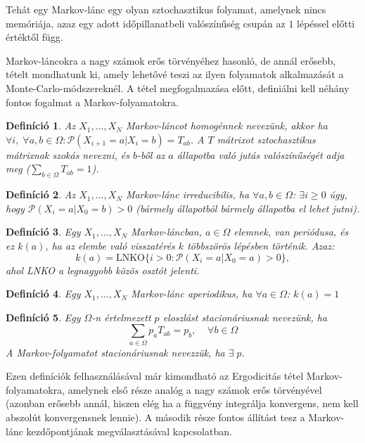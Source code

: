 \documentclass[11pt,a4paper]{article}
\numberwithin{equation}{subsection}
\numberwithin{figure}{section}
\newtheorem{definition}{Definíció}[section]
\begin{document}
Tehát egy Markov-lánc egy olyan sztochasztikus folyamat, amelynek nincs memóriája, azaz egy adott időpillanatbeli valószínűség csupán az $1$ lépéssel előtti értéktől függ. 

Markov-láncokra a nagy számok erős törvényéhez hasonló, de annál erősebb, tételt mondhatunk ki, amely lehetővé teszi az ilyen folyamatok alkalmazását a Monte-Carlo-módszereknél. A tétel megfogalmazása előtt, definiálni kell néhány fontos fogalmat a Markov-folyamatokra.

\begin{definition}
Az $X_1,\dots,X_N$ Markov-láncot homogénnek nevezünk, akkor ha $\forall i,\;\forall a,b\in\Omega: \mathcal{P}(X_{i+1}=a|X_{i}=b)=T_{ab}$. A $T$ mátrixot sztochasztikus mátrixnak szokás nevezni, és $b$-ből az $a$ állapotba való jutás valószínűségét adja meg  ($\sum_{b\in\Omega}T_{ab}=1$).
\end{definition}

\begin{definition}
Az $X_1,\dots,X_N$ Markov-lánc irreducibilis, ha $\forall a,b\in\Omega$: $\exists i\geq 0$ úgy, hogy $\mathcal{P}(X_i=a|X_{0}=b)>0$ (bármely állapotból bármely állapotba el lehet jutni).
\end{definition}

\begin{definition}
Egy $X_1,\dots,X_N$ Markov-láncban, $a\in \Omega$ elemnek, van periódusa, és ez $k(a)$, ha az elembe való visszatérés $k$ többszörös lépésben történik. Azaz:
\begin{equation}
k(a)=\mathrm{LNKO}\{i>0: \mathcal{P}(X_i=a|X_0=a)>0\},
\end{equation} 
ahol LNKO a legnagyobb közös osztót jelenti.
\end{definition}

\begin{definition}
Egy $X_1,\dots,X_N$ Markov-lánc aperiodikus, ha $\forall a\in\Omega$: $k(a)=1$
\end{definition}

\begin{definition}
Egy $\Omega$-n értelmezett $p$ eloszlást stacionáriusnak nevezünk, ha
\begin{equation}
\sum_{a\in\Omega}p_aT_{ab}=p_b,\;\;\;\;\forall b\in\Omega
\end{equation}
A Markov-folyamatot stacionáriusnak nevezzük, ha $\exists\;p$.
\end{definition}

Ezen definíciók felhasználásával már kimondható az Ergodicitás tétel Markov-folyamatokra, amelynek első része  analóg a nagy számok erős törvényével (azonban erősebb annál, hiszen elég ha a függvény integrálja konvergens, nem kell abszolút konvergensnek lennie). A második része fontos állítást tesz a Markov-lánc kezdőpontjának megválasztásával kapcsolatban.
\end{document}
